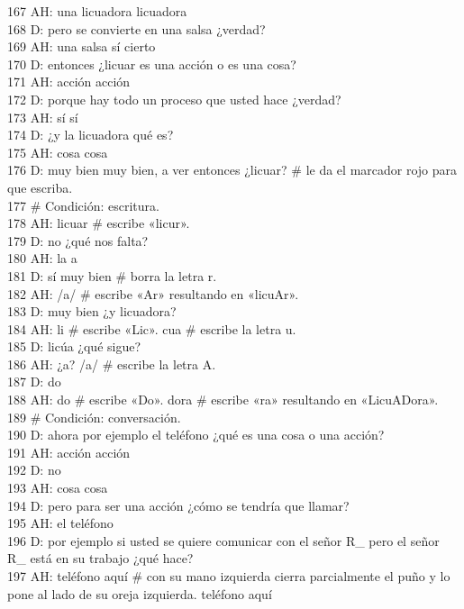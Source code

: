 167 AH: una licuadora licuadora\\
168 D: pero se convierte en una salsa ¿verdad?\\
169 AH: una salsa sí cierto\\
170 D: entonces ¿licuar es una acción o es una cosa?\\
171 AH: acción acción\\
172 D: porque hay todo un proceso que usted hace ¿verdad?\\
173 AH: sí sí\\
174 D: ¿y la licuadora qué es?\\
175 AH: cosa cosa\\
176 D: muy bien muy bien, a ver entonces ¿licuar? \# le da el marcador rojo para que escriba.\\
177 \# Condición: escritura.\\
178 AH: licuar \# escribe «licur». \\
179 D: no ¿qué nos falta?\\
180 AH: la a\\
181 D: sí muy bien \# borra la letra r.\\
182 AH: /a/ \# escribe «Ar» resultando en «licuAr».\\
183 D: muy bien ¿y licuadora?\\
184 AH: li \# escribe «Lic». cua \# escribe la letra u.\\
185 D: licúa ¿qué sigue?\\
186 AH: ¿a? /a/ \# escribe la letra A.\\
187 D: do\\
188 AH: do \# escribe «Do». dora \# escribe «ra» resultando en «LicuADora».\\
189 \# Condición: conversación.\\
190 D: ahora por ejemplo el teléfono ¿qué es una cosa o una acción?\\
191 AH: acción acción\\
192 D: no\\
193 AH: cosa cosa\\
194 D: pero para ser una acción ¿cómo se tendría que llamar?\\
195 AH: el teléfono\\
196 D: por ejemplo si usted se quiere comunicar con el señor R\_ pero el señor R\_ está en su trabajo ¿qué hace?\\
197 AH: teléfono aquí \# con su mano izquierda cierra parcialmente el puño y lo pone al lado de su oreja izquierda. teléfono aquí\\
